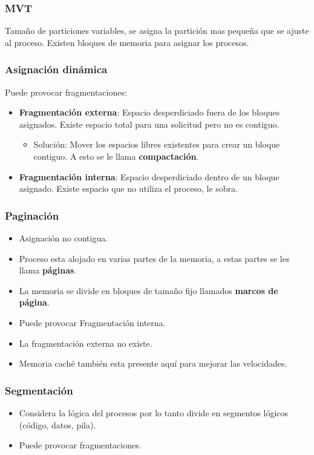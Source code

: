 \documentclass{templateNote}
\begin{document}
\subsubsection*{MVT}
Tamaño de particiones variables, se asigna la partición mas pequeña que se ajuste al proceso.
Existen bloques de memoria para asignar los procesos.

\subsubsection*{Asignación dinámica}


Puede provocar fragmentaciones:
\begin{itemize}
    \item \textbf{Fragmentación externa}: Espacio desperdiciado fuera de los bloques asignados. Existe espacio total para una solicitud pero no es contiguo.
    \begin{itemize}
        \item Solución: Mover los espacios libres existentes para crear un bloque contiguo. A esto se le llama \textbf{compactación}.
    \end{itemize}
    \item \textbf{Fragmentación interna}: Espacio desperdiciado dentro de un bloque asignado. Existe espacio que no utiliza el proceso, le sobra.
\end{itemize}

\subsubsection*{Paginación}
\begin{itemize}
    \item Asignación no contigua.
    \item Proceso esta alojado en varias partes de la memoria, a estas partes se les llama \textbf{páginas}.
    \item La memoria se divide en bloques de tamaño fijo llamados \textbf{marcos de página}.
    \item Puede provocar Fragmentación interna.
    \item La fragmentación externa no existe.
    \item Memoria caché también esta presente aquí para mejorar las velocidades.
\end{itemize}

\subsubsection*{Segmentación}
\begin{itemize}
    \item Considera la lógica del procesos por lo tanto divide en segmentos lógicos (código, datos, pila).
    \item Puede provocar fragmentaciones.
\end{itemize}
\end{document}
